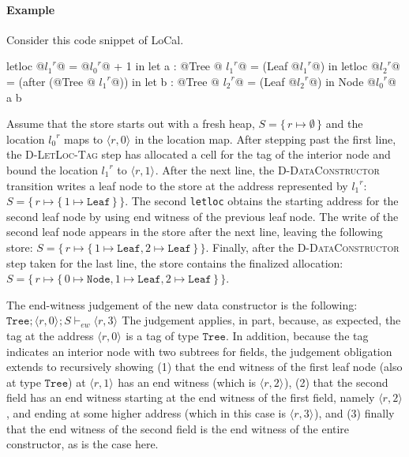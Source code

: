 \documentclass[showabstract,showacknowledgments,showpreface,showdedication,school]{iuphd}
\makeatletter
\theoremstyle{nonumberplain}
\newcommand{\sysname}[0]{LoCal\xspace}
\newcommand{\ourcalc}[0]{\sysname}
\newcommand{\keywd}[1]{\mathit{#1}}
\newcommand{\gramwd}[1]{\texttt{#1}}
\newcommand{\skeywd}[1]{\mathit{#1}}
\newcommand{\loc}{\skeywd{l}}
\newcommand{\concreteloc}[3]{\ensuremath{\langle #1, #2 \rangle ^{#3}}}
\newcommand{\reg}{\skeywd{r}}
\newcommand{\STOR}{\keywd{S}}
\newcommand\set[1]{\{ \, \ensuremath{#1} \,\}}
\newcommand{\locreg}[2]{\ensuremath{{#1}^{#2}}}
\newcommand{\tyatlocreg}[3]{#1 \ensuremath{@} \locreg{#2}{#3}}
\newcommand{\ewitness}[4]{\ensuremath{#1;#2;#3 \vdash_{ew} #4}}
\newcommand{\ddatacon}{D-DataConstructor}
\newcommand{\dletloctag}{D-LetLoc-Tag}
\makeatother
\begin{document}
\paragraph{Example} Consider this code snippet of \ourcalc{}.
\begin{code}
letloc @$\locreg{l_1}{\reg}$@ = @$\locreg{l_0}{\reg}$@ + 1 in
let a : @\tyatlocreg{Tree}{l_1}{r}@ = (Leaf @$\locreg{l_1}{\reg}$@) in
letloc @$\locreg{l_2}{\reg}$@ = (after (@\tyatlocreg{Tree}{l_1}{r}@)) in
let b : @\tyatlocreg{Tree}{l_2}{r}@ = (Leaf @$\locreg{l_2}{\reg}$@) in
Node @$\locreg{l_0}{\reg}$@ a b
\end{code}
Assume that the store starts out with a fresh heap, $\STOR = \set{\reg
  \mapsto \emptyset}$ and the location $\locreg{l_0}{\reg}$ maps to
$\concreteloc{\reg}{0}{}$ in the location map.
After stepping past the first line, the \textsc{\dletloctag{}} step has
allocated a cell for the tag of the interior node and bound the
location $\locreg{\loc_1}{\reg}$ to $\concreteloc{\reg}{1}{}$.
After the next line, the \textsc{\ddatacon{}} transition writes a leaf node to
the store at the address represented by $\locreg{\loc_1}{\reg}$:
$\STOR = \set{\reg \mapsto \set{1 \mapsto \mathtt{Leaf}}}$.
The second \gramwd{letloc} obtains the starting address for the second
leaf node by using end witness of the previous leaf node.
The write of the second leaf node appears in the store after
the next line, leaving the following store:
$
\STOR = \set{\reg \mapsto \set{1 \mapsto \mathtt{Leaf}, 2 \mapsto \mathtt{Leaf}}}$.
Finally, after the \textsc{\ddatacon{}} step taken for the last line, the store
contains the finalized allocation:
$\STOR = \set{\reg \mapsto \set{0 \mapsto \mathtt{Node}, 1 \mapsto \mathtt{Leaf}, 2 \mapsto \mathtt{Leaf}}}$.

The end-witness judgement of the new data constructor is the
following:
$\ewitness{\mathtt{Tree}}{\concreteloc{\reg}{0}{}}{\STOR}{\concreteloc{\reg}{3}{}}$
The judgement applies, in part, because, as expected, the tag at the
address $\concreteloc{\reg}{0}{}$ is a tag of type $\mathtt{Tree}$.
In addition, because the tag indicates an interior node with two
subtrees for fields, the judgement obligation extends to recursively
showing (1) that the end witness of the first leaf node (also at type
$\mathtt{Tree}$) at $\concreteloc{\reg}{1}{}$ has an end witness
(which is $\concreteloc{\reg}{2}{}$), (2) that the second field has an
end witness starting at the end witness of the first field, namely
$\concreteloc{\reg}{2}{}$, and ending at some higher address (which in
this case is $\concreteloc{\reg}{3}{}$), and (3) finally that the end
witness of the second field is the end witness of the entire
constructor, as is the case here.
\end{document}
